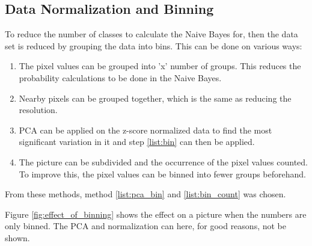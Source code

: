 \subsection{Data Normalization and Binning}

To reduce the number of classes to calculate the Naive Bayes for, then the data set is reduced by grouping the data into bins.
This can be done on various ways:

\begin{enumerate}
\item The pixel values can be grouped into 'x' number of groups.
This reduces the probability calculations to be done in the Naive Bayes. \label{list:bin}
\item Nearby pixels can be grouped together, which is the same as reducing the resolution.
\item PCA can be applied on the z-score normalized data to find the most significant variation in it and step \ref{list:bin} can then be applied. \label{list:pca_bin}
\item The picture can be subdivided and the occurrence of the pixel values counted. To improve this, the pixel values can be binned into fewer groups beforehand. \label{list:bin_count}
\end{enumerate}

From these methods, method \ref{list:pca_bin} and \ref{list:bin_count} was chosen.

Figure \ref{fig:effect_of_binning} shows the effect on a picture when the numbers are only binned.
The PCA and normalization can here, for good reasons, not be shown.


